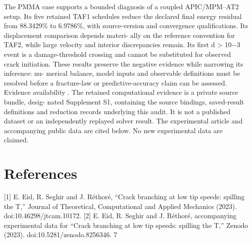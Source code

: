 \documentclass[11pt]{article}
\begin{document}
The PMMA case supports a bounded diagnosis of a coupled APIC/MPM–AT2 setup. Its five
retained TAF1 schedules reduce the declared final energy residual from 88.3429\% to 6.9786\%,
with source-version and convergence qualifications. Its displacement comparison depends materi-
ally on the reference convention for TAF2, while large velocity and interior discrepancies remain.
Its first d > 10\ensuremath{-}3 event is a damage-threshold crossing and cannot be substituted for observed
crack initiation. These results preserve the negative evidence while narrowing its inference: nu-
merical balance, model inputs and observable definitions must be resolved before a fracture-law or
predictive-accuracy claim can be assessed.
Evidence availability . The retained computational evidence is a private source bundle, desig-
nated Supplement S1, containing the source bindings, saved-result definitions and reduction records
underlying this audit. It is not a published dataset or an independently replayed solver result. The
experimental article and accompanying public data are cited below. No new experimental data are
claimed.

\section*{References}

[1] E. Eid, R. Seghir and J. Réthoré, “Crack branching at low tip speeds: spilling the T,” Journal
of Theoretical, Computational and Applied Mechanics (2023). doi:10.46298/jtcam.10172.
[2] E. Eid, R. Seghir and J. Réthoré, accompanying experimental data for “Crack branching at low
tip speeds: spilling the T,” Zenodo (2023). doi:10.5281/zenodo.8256346.
7
\end{document}
